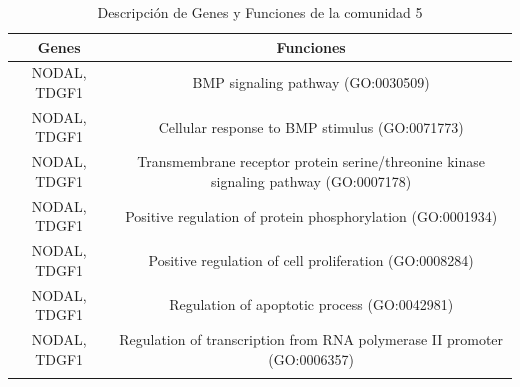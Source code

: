 \begin{table}[!]
 	\caption{Descripción de Genes y Funciones de la comunidad 5}
	\centering
	\begin{tabular}{|C|C|}
    \toprule
    \textbf{Genes} & \textbf{Funciones} \\
    \midrule
    NODAL, TDGF1 & BMP signaling pathway (GO:0030509) \\
    NODAL, TDGF1 & Cellular response to BMP stimulus (GO:0071773) \\
    NODAL, TDGF1 & Transmembrane receptor protein serine/threonine kinase signaling pathway (GO:0007178) \\
    NODAL, TDGF1 & Positive regulation of protein phosphorylation (GO:0001934) \\
    NODAL, TDGF1 & Positive regulation of cell proliferation (GO:0008284) \\
    NODAL, TDGF1 & Regulation of apoptotic process (GO:0042981) \\
    NODAL, TDGF1 & Regulation of transcription from RNA polymerase II promoter (GO:0006357) \\
    \bottomrule
    \label{tabla:genes_funciones5}
 	\end{tabular}
\end{table}




